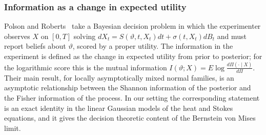 \subsubsection{Information as a change in expected utility} Polson and Roberts~\cite{polsonroberts1993} take a Bayesian decision problem in which the experimenter observes $X$ on $[0,T]$ solving $dX_t=S(\vartheta,t,X_t)dt+\sigma(t,X_t)dB_t$ and must report beliefs about $\vartheta$, scored by a proper utility. The information in the experiment is defined as the change in expected utility from prior to posterior; for the logarithmic score this is the mutual information $I(\vartheta;X)=E\log\frac{d\Pi(\cdot\mid X)}{d\Pi}$. Their main result, for locally asymptotically mixed normal families, is an asymptotic relationship between the Shannon information of the posterior and the Fisher information of the process. In our setting the corresponding statement is an exact identity in the linear Gaussian models of the heat and Stokes equations, and it gives the decision theoretic content of the Bernstein von Mises limit.

